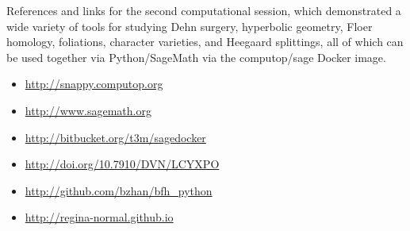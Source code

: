 \documentclass[tikz, a4paper]{nmd/hw}
\begin{document}

References and links for the second computational session, which
demonstrated a wide variety of tools for studying Dehn surgery,
hyperbolic geometry, Floer homology, foliations, character varieties,
and Heegaard splittings, all of which can be used together via
Python/SageMath via the computop/sage Docker image.

\begin{itemize}[itemsep=-5pt]
\item \url{http://snappy.computop.org}
\item \url{http://www.sagemath.org}
\item \url{http://bitbucket.org/t3m/sagedocker}
\item \url{http://doi.org/10.7910/DVN/LCYXPO}
\item \url{http://github.com/bzhan/bfh_python}
\item \url{http://regina-normal.github.io}
\end{itemize}
\end{document}
